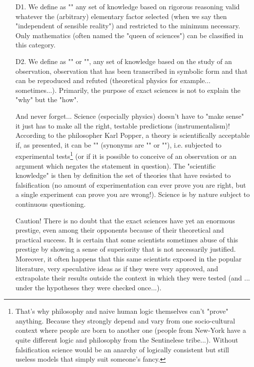 \begin{itemize}
	\item[D1.] We define as "" any set of knowledge based on rigorous reasoning valid whatever the (arbitrary) elementary factor selected (when we say then "independent of sensible reality") and restricted to the minimum necessary. Only mathematics (often named the "queen of sciences") can be classified in this category. 

	\item[D2.] We define as "" or "", any set of knowledge based on the study of an observation, observation that has been transcribed in symbolic form  and that can be reproduced and refuted (theoretical physics for example... sometimes...). Primarily, the purpose of exact sciences is not to explain the "why" but the "how". 
	
	And never forget... Science (especially physics) doesn't have to "make sense" it just has to make all the right, testable predictions (instrumentalism)! According to the philosopher Karl Popper, a theory is scientifically acceptable if, as presented, it can be "" (synonyms are "" or ""), i.e. subjected to experimental tests\footnote{That's why philosophy and naive human logic themselves can't "prove" anything. Because they strongly depend and vary from one socio-cultural context where people are born to another one (people from New-York have a quite different logic and philosophy from the Sentinelese tribe...). Without falsification science would be an anarchy of logically consistent but still useless models that simply suit someone's fancy.} (or  if it is possible to conceive of an observation or an argument which negates the statement in question). The "scientific knowledge" is then by definition the set of theories that have resisted to falsification (no amount of experimentation can ever prove you are right, but a single experiment can prove you are wrong!). Science is by nature subject to continuous questioning. 

	\begin{tcolorbox}[colback=red!5,borderline={1mm}{2mm}{red!5},arc=0mm,boxrule=0pt]
	\bcbombe Caution! There is no doubt that the exact sciences have yet an enormous prestige, even among their opponents because of their theoretical and practical success. It is certain that some scientists sometimes abuse of this prestige by showing a sense of superiority that is not necessarily justified. Moreover, it often happens that this same scientists exposed in the popular literature, very speculative ideas as if they were very approved, and extrapolate their results outside the context in which they were tested (and ... under the hypotheses they were checked once...).
	\end{tcolorbox}
	 

\end{itemize}
